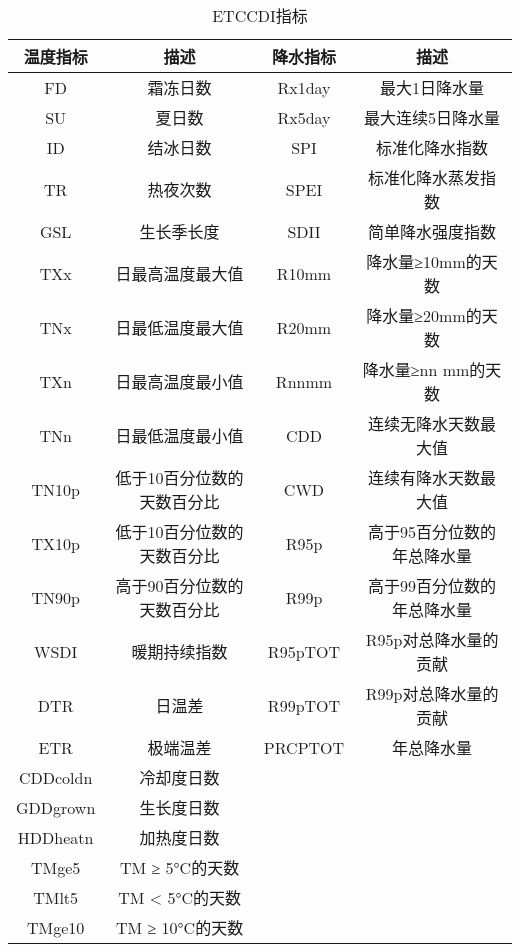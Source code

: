 \begin{longtable}{|cc|cc|}
    \caption{ETCCDI指标}\label{tab:ETCCDI}
    \\
    \toprule
    温度指标     & 描述             & 降水指标    & 描述             \\
    \midrule
    FD       & 霜冻日数           & Rx1day  & 最大1日降水量        \\
    SU       & 夏日数            & Rx5day  & 最大连续5日降水量      \\
    ID       & 结冰日数           & SPI     & 标准化降水指数        \\
    TR       & 热夜次数           & SPEI    & 标准化降水蒸发指数      \\
    GSL      & 生长季长度          & SDII    & 简单降水强度指数       \\
    TXx      & 日最高温度最大值       & R10mm   & 降水量≥10mm的天数    \\
    TNx      & 日最低温度最大值       & R20mm   & 降水量≥20mm的天数    \\
    TXn      & 日最高温度最小值       & Rnnmm   & 降水量≥nn mm的天数   \\
    TNn      & 日最低温度最小值       & CDD     & 连续无降水天数最大值     \\
    TN10p    & 低于10百分位数的天数百分比 & CWD     & 连续有降水天数最大值     \\
    TX10p    & 低于10百分位数的天数百分比 & R95p    & 高于95百分位数的年总降水量 \\
    TN90p    & 高于90百分位数的天数百分比 & R99p    & 高于99百分位数的年总降水量 \\
    WSDI     & 暖期持续指数         & R95pTOT & R95p对总降水量的贡献   \\
    DTR      & 日温差            & R99pTOT & R99p对总降水量的贡献   \\
    ETR      & 极端温差           & PRCPTOT & 年总降水量          \\
    CDDcoldn & 冷却度日数          &         &                \\
    GDDgrown & 生长度日数          &         &                \\
    HDDheatn & 加热度日数          &         &                \\
    TMge5    & TM ≥ 5°C的天数    &         &                \\
    TMlt5    & TM < 5°C的天数    &         &                \\
    TMge10   & TM ≥ 10°C的天数   &         &                \\

\end{longtable}

